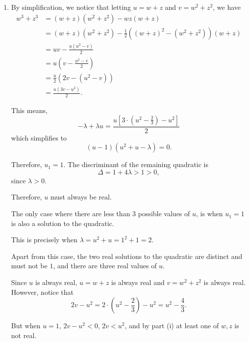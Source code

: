 \begin{enumerate}
    \item By simplification, we notice that letting \(u = w + z\) and \(v = w^2 + z^2\), we have
          \begin{align*}
              w^3 + z^3 & = (w + z)(w^2 + z^2) - wz (w + z)                                   \\
                        & = (w + z)(w^2 + z^2) - \frac{1}{2} ((w + z)^2 - (w^2 + z^2))(w + z) \\
                        & = uv - \frac{u(u^2 - v)}{2}                                         \\
                        & = u \left(v - \frac{u^2 - v}{2}\right)                              \\
                        & = \frac{u}{2} \left(2v - (u^2 - v)\right)                           \\
                        & = \frac{u (3v - u^2)}{2}.
          \end{align*}

          This means,
          \[
              -\lambda + \lambda u = \frac{u \left[3 \cdot \left(u^2 - \frac{2}{3}\right) - u^2\right]}{2}
          \]
          which simplifies to
          \[
              (u - 1)(u^2 + u - \lambda) = 0.
          \]

          Therefore, \(u_1 = 1\). The discriminant of the remaining quadratic is
          \[
              \Delta = 1 + 4\lambda > 1 > 0,
          \]
          since \(\lambda > 0\).

          Therefore, \(u\) must always be real.

          The only case where there are less than \(3\) possible values of \(u\), is when \(u_1 = 1\) is also a solution to the quadratic.

          This is precisely when \(\lambda = u^2 + u = 1^2 + 1 = 2\).

          Apart from this case, the two real solutions to the quadratic are distinct and must not be \(1\), and there are three real values of \(u\).

          Since \(u\) is always real, \(u = w + z\) is always real and \(v = w^2 + z^2\) is always real. However, notice that
          \[
              2v - u^2 = 2 \cdot \left(u^2 - \frac{2}{3}\right) - u^2 = u^2 - \frac{4}{3}.
          \]

          But when \(u = 1\), \(2v - u^2 < 0\), \(2v < u^2\), and by part (i) at least one of \(w, z\) is not real.
\end{enumerate}